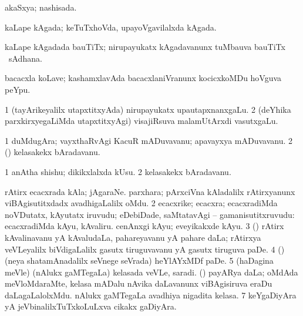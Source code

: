 \bentry
{} 
\gl{\gu}
\expl{}
\bmng
akaSxya; nashisada. 
\emng
\eentry

\bentry
{} 
\gl{\nA}
\expl{}
\bmng
kaLape kAgada; keTuTxhoVda, upayoVgavilalxda kAgada. 
\emng
\eentry

\bentry
{} 
\gl{\nA}
\expl{}
\bmng
kaLape kAgadada bauTiTx; nirupayukatx kAgadavanunx tuMbauva bauTiTx \mo\ sAdhana. 
\emng
\eentry

\bentry
{} 
\gl{\nA}
\expl{}
\bmng
bacacxla koLave; kashamxlavAda bacacxlaniVranunx kocicxkoMDu hoVguva peYpu. 
\emng
\eentry

\bentry
{} 
\gl{\nA}
\expl{}
\bmng
\bnum
\num{1} (tayArikeyalilx utapxtitxyAda) nirupayukatx upautapxnanxgaLu. 
\num{2} (deYhika parxkirxyegaLiMda utapxtitxyAgi) visajiRsuva malamUtArxdi vasutxgaLu. 
\enum
\emng
\eentry

\bentry
{} 
\gl{\nA}
\expl{}
\bmng
\bnum
\num{1} duMdugAra; vayxthaRvAgi KacuR mADuvavanu; apavayxya mADuvavanu. 
\num{2} (\AmA) kelasakekx bAradavanu. 
\enum
\emng
\eentry

\bentry
{} 
\gl{\nA}
\expl{}
\bmng
\bnum
\num{1} anAtha shishu; dikikxlalxda kUsu. 
\num{2} kelasakekx bAradavanu. 
\enum
\emng
\eentry

\bentry
{} 
\gl{\nA}
\expl{}
\bmng
\bnum
{} 
\banum
{} rAtirx ecacxrada kAla; jAgaraNe. 
 parxhara; pArxciVna kAladalilx rAtirxyanunx viBAgisutitxdadx avadhigaLalilx oMdu. 
\eanum
\numie
\num{2} ecacxrike; ecacxra; ecacxradiMda noVDutatx, kAyutatx iruvudu; eDebiDade, saMtatavAgi -- gamanisutitxruvudu:  ecacxradiMda kAyu, kAvaliru.  cenAnxgi kAyu; eveyikakxde kAyu. 
\num{3} (\ca) rAtirx kAvalinavanu yA kAvaludaLa, pahareyavanu yA pahare daLa; rAtirxya veVLeyalilx biVdigaLalilx gasutx tiruguvavanu yA gasutx tiruguva paDe. 
\num{4} (\ca) (neya shatamAnadalilx seVnege seVrada) heYlAYxMDf paDe. 
\num{5} (haDagina meVle) (nAlukx gaMTegaLa) kelasada veVLe, saradi. 
 (\nw) 
\banum
{} payARya daLa; oMdAda meVloMdaraMte, kelasa mADalu nAvika daLavanunx viBAgisiruva eraDu daLagaLalolxMdu. 
 nAlukx gaMTegaLa avadhiya nigadita kelasa. 
\eanum
\numie
\num{7} keYgaDiyAra yA jeVbinalilxTuTxkoLuLxva cikakx gaDiyAra. 
\enum
\emng

